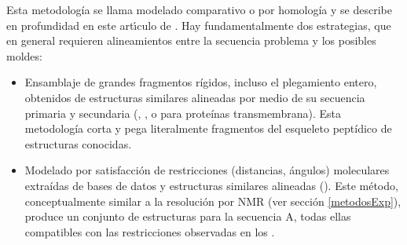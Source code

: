 Esta metodolog\'{i}a se llama modelado comparativo o por homolog\'{i}a y se describe en profundidad en este
art\'\i{}culo de \citet{Fiser2003}. %
Hay fundamentalmente dos estrategias, que en general requieren alineamientos entre la secuencia problema y los posibles moldes:
\begin{itemize}

\item Ensamblaje de grandes fragmentos r\'{i}gidos, incluso el plegamiento entero, 
obtenidos de estructuras similares alineadas por medio de su secuencia primaria y secundaria
(, 
, 
 o 
 para prote\'{i}nas transmembrana).
Esta metodolog\'{i}a corta y pega literalmente fragmentos del esqueleto pept\'{i}dico de estructuras conocidas.

\item Modelado por satisfacci\'{o}n de restricciones (distancias, \'{a}ngulos) moleculares extra\'{i}das 
de bases de datos y estructuras similares alineadas (). 
Este m\'{e}todo, conceptualmente similar a la resoluci\'{o}n por NMR (ver secci\'{o}n \ref{metodosExp}), 
produce un conjunto de estructuras para la secuencia A, 
todas ellas compatibles con las restricciones observadas en los .

\end{itemize}

